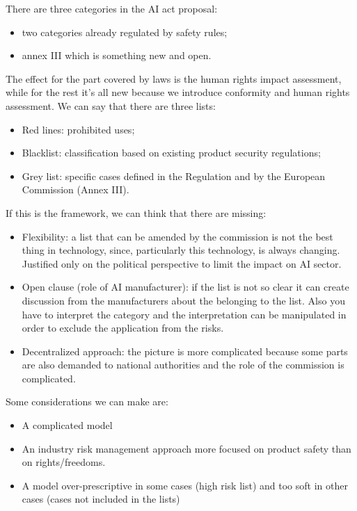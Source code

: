 There are three categories in the AI act proposal:
\begin{itemize}
    \item two categories already regulated by safety rules;
    \item annex III which is something new and open.
\end{itemize}
The effect for the part covered by laws is the human rights impact assessment, while for the rest it's all new because we introduce conformity and human rights assessment.
We can say that there are three lists:
\begin{itemize}
    \item Red lines: prohibited uses;
    \item Blacklist: classification based on existing product security regulations;
    \item Grey list: specific cases defined in the Regulation and by the European Commission (Annex III).
\end{itemize}
If this is the framework, we can think that there are missing:
\begin{itemize}
    \item Flexibility: a list that can be amended by the commission is not the best thing in technology, since, particularly this technology, is always changing. Justified only on the political perspective to limit the impact on AI sector.
    \item Open clause (role of AI manufacturer): if the list is not so clear it can create discussion from the manufacturers about the belonging to the list. Also you have to interpret the category and the interpretation can be manipulated in order to exclude the application from the risks. 
    \item Decentralized approach: the picture is more complicated because some parts are also demanded to national authorities and the role of the commission is complicated.
\end{itemize}
Some considerations we can make are:
\begin{itemize}
    \item A complicated model
    \item An industry risk management approach more focused on product safety than on rights/freedoms.
    \item A model over-prescriptive in some cases (high risk list) and too soft in other cases (cases not included in the lists)
\end{itemize}
